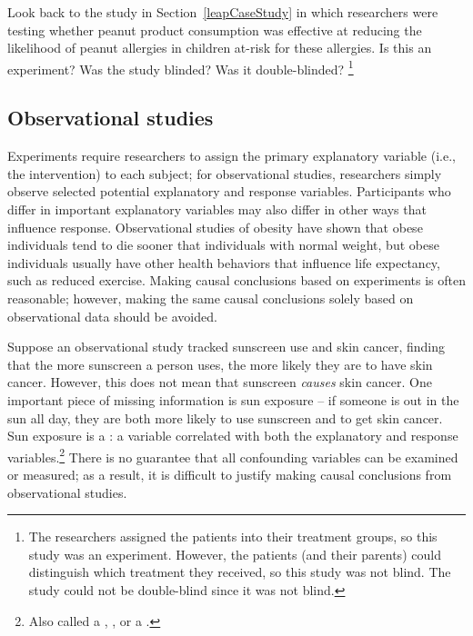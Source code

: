 \begin{exercise}
	Look back to the study in Section~\ref{leapCaseStudy} in which researchers were testing whether peanut product consumption was effective at reducing the likelihood of peanut allergies in children at-risk for these allergies. Is this an experiment? Was the study blinded? Was it double-blinded? \footnote{The researchers assigned the patients into their treatment groups, so this study was an experiment. However, the patients (and their parents) could distinguish which treatment they received, so this study was not blind. The study could not be double-blind since it was not blind.}
\end{exercise}

\subsection{Observational studies}

Experiments require researchers to assign the primary explanatory variable (i.e., the intervention) to each subject; for observational studies, researchers simply observe selected potential explanatory and response variables. Participants who differ in important explanatory variables may also differ in other ways that influence response.  Observational studies of obesity have shown that obese individuals tend to die sooner that individuals with normal weight, but obese individuals usually have other health behaviors that influence life expectancy, such as reduced exercise. Making causal conclusions based on experiments is often reasonable; however, making the same causal conclusions solely based on observational data should be avoided. 

Suppose an observational study tracked sunscreen use and skin cancer, finding that the more sunscreen a person uses, the more likely they are to have skin cancer. However, this does not mean that sunscreen \emph{causes} skin cancer. One important piece of missing information is sun exposure -- if someone is out in the sun all day, they are both more likely to use sunscreen and to get skin cancer. Sun exposure is a  : a variable correlated with both the explanatory and response variables.\footnote{Also called a , , or a .} There is no guarantee that all confounding variables can be examined or measured; as a result, it is difficult to justify making causal conclusions from observational studies. 

